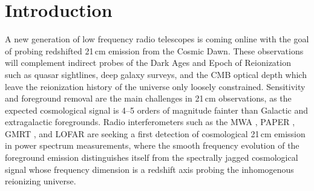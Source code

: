 \documentclass{emulateapj}
\begin{document}


\section{Introduction}

A new generation of low frequency radio telescopes is coming online with the goal of
 probing redshifted 21\,cm emission from the Cosmic Dawn. These observations will 
 complement indirect probes of the Dark Ages and Epoch of Reionization such as quasar 
 sightlines, deep galaxy surveys, and the CMB optical depth which leave the reionization 
 history of the universe only loosely constrained. Sensitivity and foreground removal are 
 the main challenges in 21\,cm observations, as the expected cosmological signal is 4--5 
 orders of magnitude fainter than Galactic and extragalactic foregrounds. Radio 
 interferometers such as the MWA \citep{tingay13}, PAPER \citep{ali2015}, GMRT 
 \citep{Paciga2011}, and LOFAR \citep{lofar} are seeking a first detection of 
 cosmological 21\,cm emission in power spectrum measurements, where the smooth 
 frequency evolution of the foreground emission distinguishes itself from the spectrally 
 jagged cosmological signal whose frequency dimension is a redshift axis probing the 
 inhomogenous reionizing universe.

\end{document}
